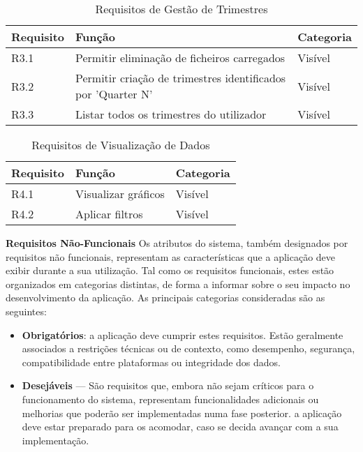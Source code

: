 \begin{table}[H]
\centering
\begin{tabular}{|l|p{7cm}|l|}
\hline
\textbf{Requisito} & \textbf{Função} & \textbf{Categoria} \\
\hline
R3.1 & Permitir eliminação de ficheiros carregados & Visível \\
R3.2 & Permitir criação de trimestres identificados por 'Quarter N' & Visível \\
R3.3 & Listar todos os trimestres do utilizador & Visível \\
\hline
\end{tabular}
\caption{Requisitos de Gestão de Trimestres}
\label{tab:requisitosTrimestres}
\end{table}

\begin{table}[H]
\centering
\begin{tabular}{|l|p{7cm}|l|}
\hline
\textbf{Requisito} & \textbf{Função} & \textbf{Categoria} \\
\hline
R4.1 & Visualizar gráficos & Visível \\
R4.2 & Aplicar filtros & Visível \\
\hline
\end{tabular}
\caption{Requisitos de Visualização de Dados}
\label{tab:requisitosVisualizacao}
\end{table}

\textbf{Requisitos Não-Funcionais}
Os atributos do sistema, também designados por requisitos não funcionais, representam as características que a aplicação deve exibir durante a sua utilização. Tal como os requisitos funcionais, estes estão organizados em categorias distintas, de forma a informar sobre o seu impacto no desenvolvimento da aplicação. As principais categorias consideradas são as seguintes:

\begin{itemize}
\item \textbf{Obrigatórios}: a aplicação deve cumprir estes requisitos. Estão geralmente associados a restrições técnicas ou de contexto, como desempenho, segurança, compatibilidade entre plataformas ou integridade dos dados.

\item \textbf{Desejáveis} — São requisitos que, embora não sejam críticos para o funcionamento do sistema, representam funcionalidades adicionais ou melhorias que poderão ser implementadas numa fase posterior. a aplicação deve estar preparado para os acomodar, caso se decida avançar com a sua implementação.
\end{itemize}

